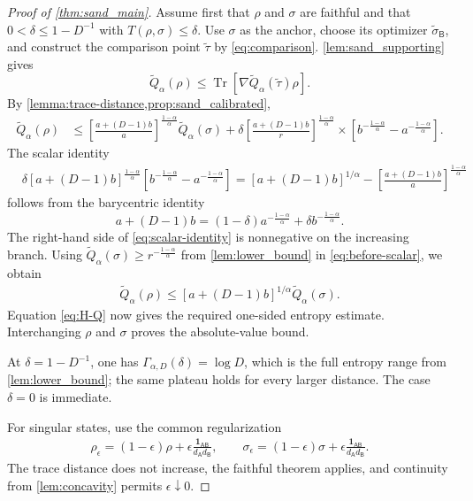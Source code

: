 \documentclass[11pt,reqno]{amsart}
\theoremstyle{definition}
\DeclareMathOperator{\Tr}{Tr}
\newcommand{\I}{\mathbf 1}
\newcommand{\A}{\mathsf{A}}
\newcommand{\B}{\mathsf{B}}
\newcommand{\sand}{\widetilde}
\begin{document}
\begin{proof}[Proof of \cref{thm:sand_main}]
Assume first that $\rho$ and $\sigma$ are faithful and that
$0<\delta\leq1-D^{-1}$ with $T(\rho,\sigma)\leq\delta$.  Use $\sigma$ as the
anchor, choose its optimizer $\sand\sigma_{\B}$, and construct the comparison
point $\sand\tau$ by \cref{eq:comparison}.  
\cref{lem:sand_supporting} gives
\[
 \sand Q_{\alpha}(\rho)
 \leq
 \Tr\!\left[\nabla\sand Q_{\alpha}(\sand\tau)\rho\right].
\]
By \cref{lemma:trace-distance,prop:sand_calibrated},
\begin{align}
\sand Q_{\alpha}(\rho)
&\leq
\left[
\frac{a+(D-1)b}{a}
\right]^{\frac{1-\alpha}{\alpha}}
\sand Q_{\alpha}(\sigma)
+
\delta
\left[
\frac{a+(D-1)b}{r}
\right]^{\frac{1-\alpha}{\alpha}}
\times
\left[
b^{-\frac{1-\alpha}{\alpha}}
-a^{-\frac{1-\alpha}{\alpha}}
\right].
 \label{eq:before-scalar}
\end{align}
The scalar identity
\begin{align}
&\delta[a+(D-1)b]^{\frac{1-\alpha}{\alpha}}
\left[
 b^{-\frac{1-\alpha}{\alpha}}
 -a^{-\frac{1-\alpha}{\alpha}}
\right]
=
[a+(D-1)b]^{1/\alpha}
-
\left[
\frac{a+(D-1)b}{a}
\right]^{\frac{1-\alpha}{\alpha}}
\label{eq:scalar-identity}
\end{align}
follows from the barycentric identity
\begin{equation}
 a+(D-1)b
 =(1-\delta)a^{-\frac{1-\alpha}{\alpha}}
 +\delta b^{-\frac{1-\alpha}{\alpha}}.
\label{eq:barycentric}
\end{equation}
The right-hand side of \cref{eq:scalar-identity} is nonnegative on the
increasing branch.  Using
$\sand Q_{\alpha}(\sigma)\geq r^{-\frac{1-\alpha}{\alpha}}$ from
\cref{lem:lower_bound} in \cref{eq:before-scalar}, we obtain
\begin{align}
 \sand Q_{\alpha}(\rho)
 \leq
 [a+(D-1)b]^{1/\alpha}
 \sand Q_{\alpha}(\sigma).
 \label{eq:Q-ratio}
\end{align}
Equation \cref{eq:H-Q} now gives the required one-sided entropy estimate.
Interchanging $\rho$ and $\sigma$ proves the absolute-value bound.

At $\delta=1-D^{-1}$, one has
$\Gamma_{\alpha,D}(\delta)=\log D$,
which is the full entropy range from \cref{lem:lower_bound}; the same plateau holds
for every larger distance.  The case $\delta=0$ is immediate.

For singular states, use the common regularization
\begin{align}
 \rho_{\epsilon}=(1-\epsilon)\rho+\epsilon\frac{\I_{\A\B}}{d_{\A}d_{\B}},
 \qquad
 \sigma_{\epsilon}=(1-\epsilon)\sigma+\epsilon\frac{\I_{\A\B}}{d_{\A}d_{\B}}.
\end{align}
The trace distance does not increase, the faithful theorem applies, and
continuity from \cref{lem:concavity} permits $\epsilon\downarrow0$.
\end{proof}
\end{document}
